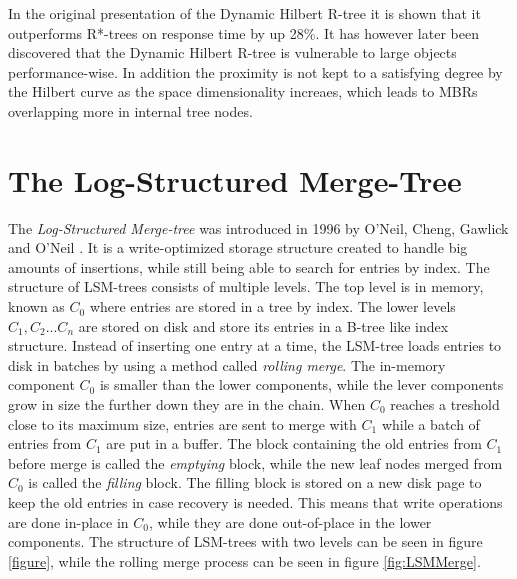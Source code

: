 In the original presentation of the Dynamic Hilbert R-tree it is shown that it outperforms R*-trees on response time by up 28\%\cite{HilbertRTree}. It has however later been discovered that the Dynamic Hilbert R-tree is vulnerable to large objects performance-wise. In addition the proximity is not kept to a satisfying degree by the Hilbert curve as the space dimensionality increaes, which leads to MBRs overlapping more in internal tree nodes\cite{RTreesTheoryApplications}.


\section{The Log-Structured Merge-Tree}
The \emph{Log-Structured Merge-tree} was introduced in 1996 by O'Neil, Cheng, Gawlick and O'Neil \cite{LSMTree}. It is a write-optimized storage structure created to handle big amounts of insertions, while still being able to search for entries by index. The structure of LSM-trees consists of multiple levels. The top level is in memory, known as $C_0$ where entries are stored in a tree by index. The lower levels $C_1, C_2 ... C_n$ are stored on disk and store its entries in a B-tree like index structure. Instead of inserting one entry at a time, the LSM-tree loads entries to disk in batches by using a method called \emph{rolling merge}. The in-memory component $C_0$ is smaller than the lower components, while the lever components grow in size the further down they are in the chain. When $C_0$ reaches a treshold close to its maximum size, entries are sent to merge with $C_1$ while a batch of entries from $C_1$ are put in a buffer. The block containing the old entries from $C_1$ before merge is called the \emph{emptying} block, while the new leaf nodes merged from $C_0$ is called the \emph{filling} block. The filling block is stored on a new disk page to keep the old entries in case recovery is needed. This means that write operations are done in-place in $C_0$, while they are done out-of-place in the lower components. The structure of LSM-trees with two levels can be seen in figure \ref{figure}, while the rolling merge process can be seen in figure \ref{fig:LSMMerge}. 

